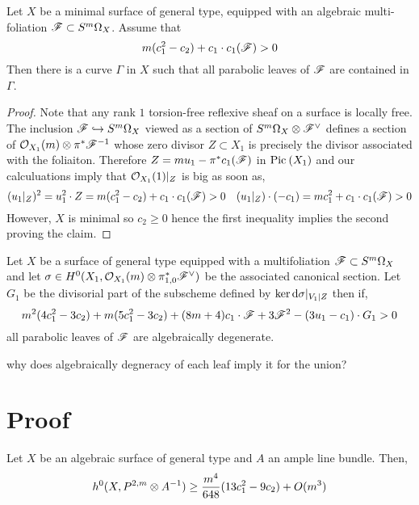 \documentclass[12pt]{article}
\begin{document}
\begin{prop}
Let $X$ be a minimal surface of general type, equipped with an algebraic multi-foliation $\mathscr{F} \subset S^m \Omega_X$. Assume that
\[ m (c_1^2 - c_2) + c_1 \cdot c_1(\mathscr{F}) > 0 \]
Then there is a curve $\Gamma$ in $X$ such that all parabolic leaves of $\mathscr{F}$ are contained in $\Gamma$.
\end{prop}

\begin{proof}
Note that any rank $1$ torsion-free {\color{red} reflexive} sheaf on a surface is locally free. The inclusion $\mathscr{F} \hookrightarrow S^m \Omega_X$ viewed as a section of $S^m \Omega_X \otimes \mathscr{F}^{\vee}$ defines a section of $\mathcal{O}_{X_1}(m) \otimes \pi^* \mathscr{F}^{-1}$ whose zero divisor $Z \subset X_1$ is precisely the divisor associated with the foliaiton. Therefore $Z = m u_1 - \pi^* c_1(\mathscr{F})$ in $\mathrm{Pic}^{} \left( X_1 \right)$ and our calculuations imply that $\mathcal{O}_{X_1}(1)|_Z$ is big as soon as,
\[ (u_1|_Z)^2 = u_1^2 \cdot Z = m (c_1^2 - c_2) + c_1 \cdot c_1(\mathscr{F}) > 0 \quad (u_1|_Z) \cdot (-c_1) = m c_1^2 + c_1 \cdot c_1(\mathscr{F}) > 0 \]
However, $X$ is minimal so $c_2 \ge 0$ hence the first inequality implies the second proving the claim.
\end{proof}

\begin{prop}
Let $X$ be a surface of general type equipped with a multifoliation $\mathscr{F} \subset S^m \Omega_X$ and let $\sigma \in H^0(X_1, \mathcal{O}_{X_1}(m) \otimes \pi^*_{1,0} \mathscr{F}^\vee)$ be the associated canonical section. Let $G_1$ be the divisorial part of the subscheme defined by $\ker{\mathrm{d}{\sigma}|_{V_1|Z}}$ then if,
\[ m^2 (4 c_1^2 - 3 c_2) + m(5 c_1^2 - 3 c_2) + (8m + 4)c_1 \cdot \mathscr{F} + 3 \mathscr{F}^2 - (3 u_1 - c_1) \cdot G_1  > 0\]
all parabolic leaves of $\mathscr{F}$ are algebraically degenerate.  
\end{prop}

{\color{red} why does algebraically degneracy of each leaf imply it for the union?}

\section{Proof}

\begin{theorem}[Dem95]
Let $X$ be an algebraic surface of general type and $A$ an ample line bundle. Then,
\[ h^0(X, P^{2,m} \otimes A^{-1}) \ge \frac{m^4}{648} (13 c_1^2 - 9 c_2) + O(m^3) \]
\end{theorem}
\end{document}
